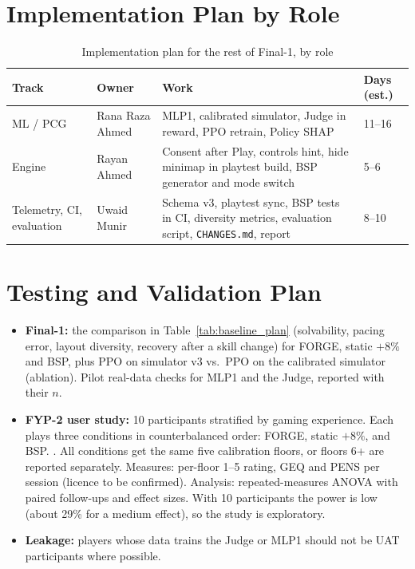 \section{Implementation Plan by Role}
\begin{table}[!htbp]
\centering
\caption{Implementation plan for the rest of Final-1, by role}
\label{tab:impl_plan}
\scriptsize
\begin{tabular}{p{}p{}p{}p{}}
\toprule
\textbf{Track} & \textbf{Owner} & \textbf{Work} & \textbf{Days (est.)} \\
\midrule
ML / PCG & Rana Raza Ahmed & MLP1, calibrated simulator, Judge in reward, PPO retrain, Policy SHAP & 11--16 \\
Engine & Rayan Ahmed & Consent after Play, controls hint, hide minimap in playtest build, BSP generator and mode switch & 5--6 \\
Telemetry, CI, evaluation & Uwaid Munir & Schema v3, playtest sync, BSP tests in CI, diversity metrics, evaluation script, \texttt{CHANGES.md}, report & 8--10 \\
\bottomrule
\end{tabular}
\end{table}

\section{Testing and Validation Plan}
\begin{itemize}
    \item \textbf{Final-1:} the comparison in Table~\ref{tab:baseline_plan} (solvability, pacing error, layout diversity, recovery after a skill change) for FORGE, static $+8\%$ and BSP, plus PPO on simulator v3 vs.\ PPO on the calibrated simulator (ablation). Pilot real-data checks for MLP1 and the Judge, reported with their $n$.
    \item \textbf{FYP-2 user study:} 10 participants stratified by gaming experience. Each plays three conditions in counterbalanced order: FORGE, static $+8\%$, and BSP. . All conditions get the same five calibration floors, or floors 6+ are reported separately. Measures: per-floor 1--5 rating, GEQ and PENS per session (licence to be confirmed). Analysis: repeated-measures ANOVA with paired follow-ups and effect sizes. With 10 participants the power is low (about 29\% for a medium effect), so the study is exploratory.
    \item \textbf{Leakage:} players whose data trains the Judge or MLP1 should not be UAT participants where possible.
\end{itemize}

